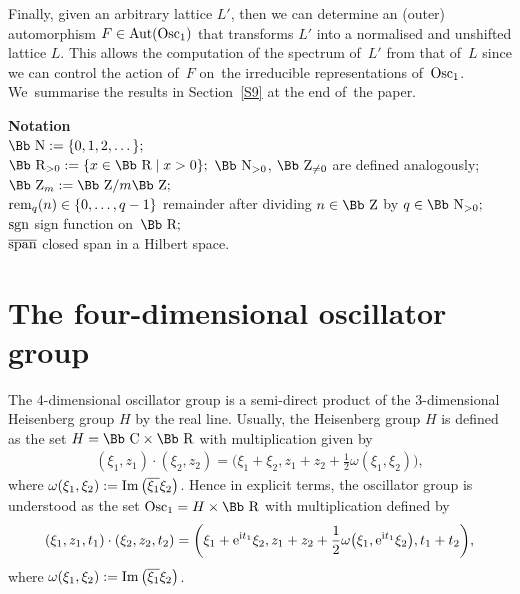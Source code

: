\documentclass[pdftex]{sigma}
\newcommand\CC{{\mbox{\Bb C}}}
\newcommand\RR{{\mbox{\Bb R}}}
\newcommand\NN{{\mbox{\Bb N}}}
\newcommand\ZZ{{\mbox{\Bb Z}}}
\newcommand{\Aut}{\mathop{{\rm Aut}}}
\newcommand{\Osc}{{\rm Osc}}
\newcommand{\sgn}{\mathop{{\rm sgn}}}
\renewcommand{\Im}{\mathop{{\rm Im}}}
\newcommand{\rem}{\mathop{{\rm rem}}}
\newcommand{\cSpan}{{\overline{\rm span}}}
\numberwithin{equation}{section}
\begin{document}
Finally, given an arbitrary lattice $L'$, then we can determine an (outer) automorphism $F\in\Aut(\Osc_1)$ that transforms $L'$ into a normalised and unshifted lattice $L$. This allows the computation of the spectrum of~$L'$ from that of~$L$ since we can control the action of~$F$ on~the irre\-ducible representations of~$\Osc_1$. We~summarise the results in Section~\ref{S9} at the end of~the paper.

\medskip

\noindent\textbf{Notation} \\[1ex]
$\NN:=\{0,1,2,\dots\};$\\[.5ex]
$\RR_{>0}:=\{x\in\RR\mid x>0\};$ $\NN_{>0}$, $\ZZ_{\not=0}$ are defined analogously; \\[.5ex]
$\ZZ_m:=\ZZ/{m\ZZ};$\\[.5ex]
$\rem_q(n)\in\{0,\dots,q-1\}$ \quad remainder after dividing $n\in\ZZ$ by $q\in\NN_{>0};$\\[.5ex]
$\sgn$ \quad sign function on~$\RR;$\\[.5ex]
$\cSpan$ \quad closed span in a Hilbert space.


\section{The four-dimensional oscillator group}
The 4-dimensional oscillator group is a semi-direct product of the 3-dimensional Heisenberg group $H$ by the real line. Usually, the Heisenberg group $H$ is defined as the set $H=\CC\times\RR$ with multiplication given by
\begin{gather*}
(\xi_1,z_1)\cdot(\xi_2,z_2)=\bigg(\xi_1+\xi_2,z_1+z_2+{\frac12}\omega(\xi_1,\xi_2)\bigg),
\end{gather*}
where $\omega(\xi_1,\xi_2):=\Im\big(\overline{\xi_1}\xi_2\big)$. Hence in explicit terms, the oscillator group is understood as the set $\Osc_1=H\times\RR$ with multiplication defined by
\begin{gather*}
(\xi_1,z_1,t_1)\cdot(\xi_2,z_2,t_2)=\bigg(\xi_1+{\rm e}^{{\rm i}t_1}\xi_2,z_1+z_2+{\frac12}\omega\big(\xi_1,{\rm e}^{{\rm i}t_1}\xi_2\big),t_1+t_2\bigg),
\end{gather*}
where $\omega(\xi_1,\xi_2):=\Im\big(\overline{\xi_1}\xi_2\big)$.
\end{document}
